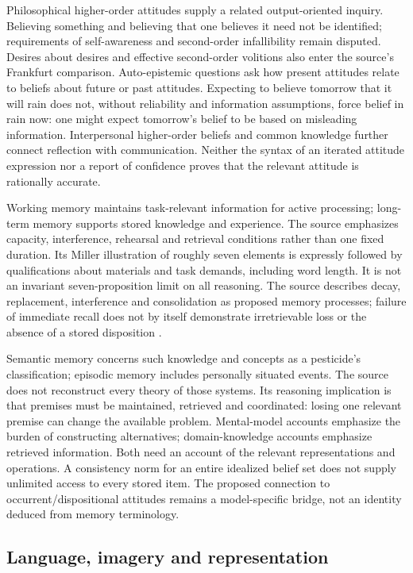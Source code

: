 Philosophical higher-order attitudes supply a related output-oriented
inquiry. Believing something and believing that one believes it need
not be identified; requirements of self-awareness and second-order
infallibility remain disputed. Desires about desires and effective
second-order volitions also enter the source's Frankfurt comparison.
Auto-epistemic questions ask how present attitudes relate to beliefs
about future or past attitudes. Expecting to believe tomorrow that it
will rain does not, without reliability and information assumptions,
force belief in rain now: one might expect tomorrow's belief to be
based on misleading information. Interpersonal higher-order beliefs
and common knowledge further connect reflection with communication.
Neither the syntax of an iterated attitude expression nor a report
of confidence proves that the relevant attitude is rationally accurate.

Working memory maintains task-relevant information for active
processing; long-term memory supports stored knowledge and experience.
The source emphasizes capacity, interference, rehearsal and retrieval
conditions rather than one fixed duration. Its Miller illustration of
roughly seven elements is expressly followed by qualifications about
materials and task demands, including word length. It is not an
invariant seven-proposition limit on all reasoning. The source describes
decay, replacement, interference and consolidation as proposed memory
processes; failure of immediate recall does not by itself demonstrate
irretrievable loss or the absence of a stored disposition
\cite[pp.~39--40]{KnauffSpohn2021FrameworksIntro}.

Semantic memory concerns such knowledge and concepts as a pesticide's
classification; episodic memory includes personally situated events.
The source does not reconstruct every theory of those systems.
Its reasoning implication is that premises must be maintained, retrieved
and coordinated: losing one relevant premise can change the available
problem. Mental-model accounts emphasize the burden of constructing
alternatives; domain-knowledge accounts emphasize retrieved information.
Both need an account of the relevant representations and operations.
A consistency norm for an entire idealized belief set does not supply
unlimited access to every stored item. The proposed connection to
occurrent/dispositional attitudes remains a model-specific bridge,
not an identity deduced from memory terminology.

\subsection{Language, imagery and representation}

